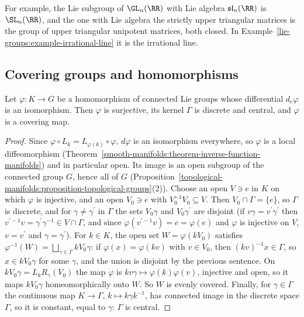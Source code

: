 For example, the Lie subgroup of $\GL_n(\RR)$ with Lie algebra $\mathfrak{sl}_n(\RR)$ is $\SL_n(\RR)$, and the one with Lie algebra the strictly upper triangular
matrices is the group of upper triangular unipotent matrices, both closed. In Example~\ref{lie-groups:example-irrational-line} it is the irrational line.

\subsection{Covering groups and homomorphisms}\label{lie-groups:subsection-covering-groups}

\begin{lemma}\label{lie-groups:lemma-local-isomorphism-covering}
Let $\varphi \colon K \to G$ be a homomorphism of connected Lie groups whose differential $d_e\varphi$ is an isomorphism. Then $\varphi$ is surjective, its kernel $\Gamma$ is
discrete and central, and $\varphi$ is a covering map.
\end{lemma}

\begin{proof}
Since $\varphi \circ L_k = L_{\varphi(k)} \circ \varphi$, $d\varphi$ is an isomorphism everywhere, so $\varphi$ is a local diffeomorphism
(Theorem~\ref{smooth-manifolds:theorem-inverse-function-manifolds}) and in particular open. Its image is an open subgroup of the connected group $G$, hence all
of $G$ (Proposition~\ref{topological-manifolds:proposition-topological-groups}(2)). Choose an open $V \ni e$ in $K$ on which $\varphi$ is injective, and an open
$V_0 \ni e$ with $V_0^{-1}V_0 \subseteq V$. Then $V_0 \cap \Gamma = \{e\}$, so $\Gamma$ is discrete, and for $\gamma \neq \gamma^{\prime}$ in $\Gamma$ the sets $V_0\gamma$ and
$V_0\gamma^{\prime}$ are disjoint (if $v\gamma = v^{\prime}\gamma^{\prime}$ then $v^{\prime-1}v = \gamma^{\prime}\gamma^{-1} \in V \cap \Gamma$, and since $\varphi(v^{\prime-1}v) = e = \varphi(e)$ and $\varphi$ is
injective on $V$, $v = v^{\prime}$ and $\gamma = \gamma^{\prime}$). For $k \in K$, the open set $W = \varphi(kV_0)$ satisfies $\varphi^{-1}(W) = \bigsqcup_{\gamma \in \Gamma}kV_0\gamma$: if
$\varphi(x) = \varphi(kv)$ with $v \in V_0$, then $(kv)^{-1}x \in \Gamma$, so $x \in kV_0\gamma$ for some $\gamma$, and the union is disjoint by the previous sentence. On
$kV_0\gamma = L_kR_\gamma(V_0)$ the map $\varphi$ is $kv\gamma \mapsto \varphi(k)\varphi(v)$, injective and open, so it maps $kV_0\gamma$ homeomorphically onto $W$. So $W$ is evenly
covered. Finally, for
$\gamma \in \Gamma$ the continuous map $K \to \Gamma$, $k \mapsto k\gamma k^{-1}$, has connected image in the discrete space $\Gamma$, so it is constant, equal to $\gamma$:
$\Gamma$ is central.
\end{proof}

